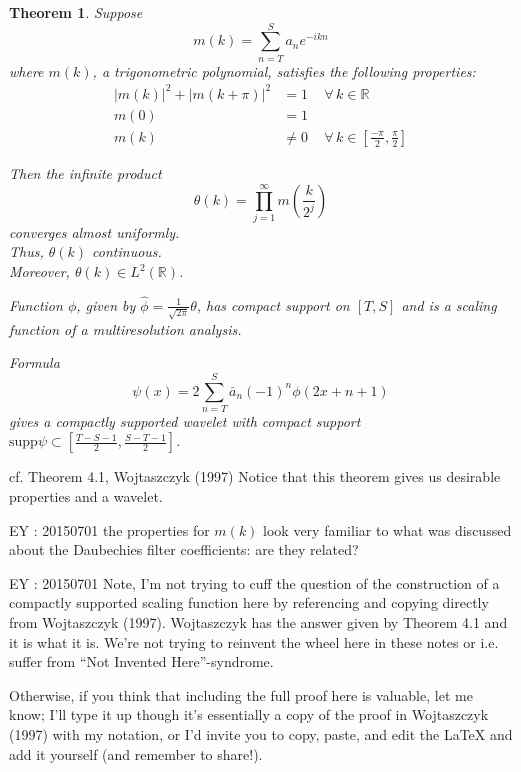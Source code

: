 \documentclass[twoside]{amsart}
\theoremstyle{plain}
\newtheorem{theorem}{Theorem}
\theoremstyle{definition}
\theoremstyle{remark}
\numberwithin{equation}{section}
\begin{document}
\begin{theorem}
  Suppose 
\[
m(k) = \sum_{n = T}^S a_n e^{-i kn}
\]
where $m(k)$, a trigonometric polynomial, satisfies the following properties:
\[
\begin{aligned}
  |m(k)|^2 + |m(k+\pi)|^2 & = 1  \quad \, \forall \, k \in \mathbb{R} \\ 
  m(0) & = 1 \\ 
  m(k) & \neq 0 \quad \, \forall \, k \in \left[ \frac{-\pi}{2}, \frac{\pi}{2} \right]
\end{aligned}
\]

Then the infinite product
\[
\theta(k) = \prod_{j=1}^{\infty} m\left( \frac{k}{2^j} \right)
\]
converges almost uniformly.   \\
Thus, $\theta(k)$ continuous. \\
Moreover, $\theta(k) \in L^2(\mathbb{R})$. 

Function $\phi$, given by $\widehat{\phi} = \frac{1}{\sqrt{2\pi}} \theta$, has compact support on $[T,S]$ and is a \emph{scaling function} of a \emph{multiresolution analysis}. 

Formula 
\[
\psi(x) = 2 \sum_{n=T}^S \bar{a}_n (-1)^n \phi(2x + n +1)
\]
gives a compactly supported wavelet with compact support $\text{supp}\psi \subset \left[ \frac{T-S-1}{2} , \frac{S-T-1}{2} \right]$.  
\end{theorem}cf. Theorem 4.1, Wojtaszczyk (1997)\cite{PWojtaszczyk1997}
Notice that this theorem gives us desirable properties and a wavelet.  

EY : 20150701 the properties for $m(k)$ look very familiar to what was discussed about the Daubechies filter coefficients: are they related?

EY : 20150701 Note, I'm not trying to cuff the question of the construction of a compactly supported scaling function here by referencing and copying directly from Wojtaszczyk (1997)\cite{PWojtaszczyk1997}.  Wojtaszczyk has the answer given by Theorem 4.1 and it is what it is.  We're not trying to reinvent the wheel here in these notes or i.e. suffer from  ``Not Invented Here''-syndrome. 

Otherwise, if you think that including the full proof here is valuable, let me know; I'll type it up though it's essentially a copy of the proof in Wojtaszczyk (1997)\cite{PWojtaszczyk1997} with my notation, or I'd invite you to copy, paste, and edit the LaTeX and add it yourself (and remember to share!).  
\end{document}
